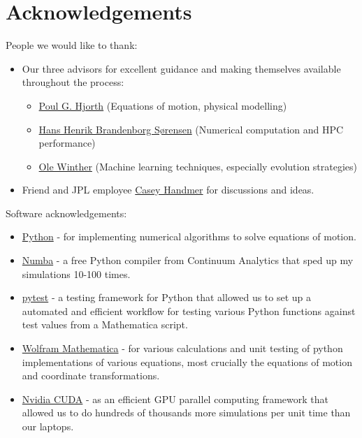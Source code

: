 \chapter{Acknowledgements}
People we would like to thank:
\begin{itemize}
    \item Our three advisors for excellent guidance and making themselves available throughout the process:
    \begin{itemize}
        \item \href{http://www.dtu.dk/english/service/phonebook/person?id=901&tab=1}{Poul G. Hjorth} (Equations of motion, physical modelling)
        \item \href{http://www.dtu.dk/english/service/phonebook/person?id=30220&tab=1}{Hans Henrik Brandenborg Sørensen} (Numerical computation and HPC performance)
        \item \href{http://www.dtu.dk/english/service/phonebook/person?id=10167&tab=1}{Ole Winther} (Machine learning techniques, especially evolution strategies)
    \end{itemize}
    \item Friend and JPL employee \href{https://www.linkedin.com/in/casey-handmer-60183262/}{Casey Handmer} for discussions and ideas.
\end{itemize}
\vspace{1cm}
Software acknowledgements:
\begin{itemize}
    \item \href{https://www.python.org}{Python} - for implementing numerical algorithms to solve equations of motion.
    \item \href{http://numba.pydata.org}{Numba} - a free Python compiler from Continuum Analytics that sped up my simulations 10-100 times.
    \item \href{https://docs.pytest.org/en/latest/}{pytest} - a testing framework for Python that allowed us to set up a automated and efficient workflow for testing various Python functions against test values from a Mathematica script.
    \item \href{http://www.wolfram.com/mathematica/}{Wolfram Mathematica} - for various calculations and unit testing of python implementations of various equations, most crucially the equations of motion and coordinate transformations.
    \item \href{https://developer.nvidia.com/cuda-zone}{Nvidia CUDA} - as an efficient GPU parallel computing framework that allowed us to do hundreds of thousands more simulations per unit time than our laptops.
\end{itemize}